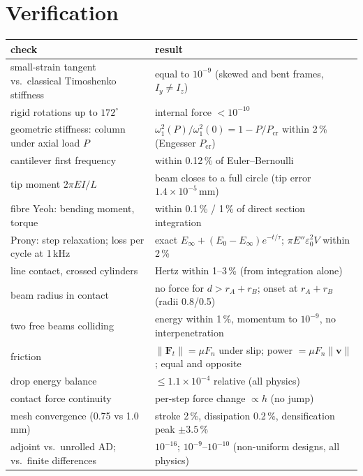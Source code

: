 \documentclass[11pt,a4paper]{article}
\newcommand{\vect}[1]{\bm{#1}}
\begin{document}
\section{Verification}
\label{sec:verification}
\begin{longtable}{p{}p{}}
\toprule
check & result\\
\midrule
small-strain tangent vs.\ classical Timoshenko stiffness & equal to $10^{-9}$ (skewed and bent frames, $I_y\neq I_z$)\\
rigid rotations up to $172^\circ$ & internal force $<10^{-10}$\\
geometric stiffness: column under axial load $P$ & $\omega_1^2(P)/\omega_1^2(0) = 1-P/P_\mathrm{cr}$ within 2\,\% (Engesser $P_\mathrm{cr}$)\\
cantilever first frequency & within 0.12\,\% of Euler--Bernoulli\\
tip moment $2\pi EI/L$ & beam closes to a full circle (tip error $1.4\times10^{-5}$\,mm)\\
fibre Yeoh: bending moment, torque & within 0.1\,\% / 1\,\% of direct section integration\\
Prony: step relaxation; loss per cycle at 1\,kHz & exact $E_\infty + (E_0-E_\infty)e^{-t/\tau}$; $\pi E''\varepsilon_0^2V$ within 2\,\%\\
line contact, crossed cylinders & Hertz within 1--3\,\% (from integration alone)\\
beam radius in contact & no force for $d > r_A + r_B$; onset at $r_A+r_B$ (radii 0.8/0.5)\\
two free beams colliding & energy within 1\,\%, momentum to $10^{-9}$, no interpenetration\\
friction & $\lVert\vect F_t\rVert = \mu F_n$ under slip; power $=\mu F_n\lVert\vect v\rVert$; equal and opposite\\
drop energy balance & $\le 1.1\times10^{-4}$ relative (all physics)\\
contact force continuity & per-step force change $\propto h$ (no jump)\\
mesh convergence (0.75 vs 1.0\,mm) & stroke 2\,\%, dissipation 0.2\,\%, densification peak $\pm3.5$\,\%\\
adjoint vs.\ unrolled AD; vs.\ finite differences & $10^{-16}$; $10^{-9}$--$10^{-10}$ (non-uniform designs, all physics)\\
\bottomrule
\end{longtable}

\end{document}
